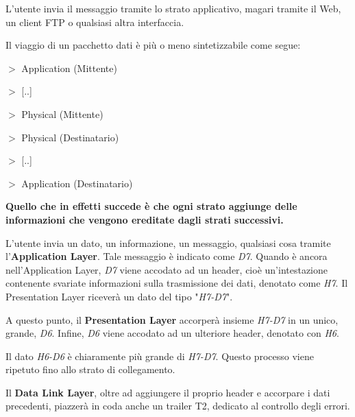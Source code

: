         L'utente invia il messaggio tramite lo strato applicativo, magari tramite il Web, un client FTP o qualsiasi altra interfaccia.
        
        \vspace{3mm}
        
        Il viaggio di un pacchetto dati è più o meno sintetizzabile come segue:
        
        \vspace{3mm}
        
        \(>\) Application (Mittente) 
        
        \(>\) [..] 
        
        \(>\) Physical (Mittente) 
        
        \(>\) Physical (Destinatario) 
        
        \(>\) [..] 
        
        \(>\) Application (Destinatario)
        
        \vspace{3mm}
        
        \textbf{Quello che in effetti succede è che ogni strato aggiunge delle informazioni che vengono ereditate dagli strati successivi.}
        
        L'utente invia un dato, un informazione, un messaggio, qualsiasi cosa tramite l'\textbf{Application Layer}. Tale messaggio è indicato come \textit{D7}. Quando è ancora nell'Application Layer, \textit{D7} viene accodato ad un header, cioè un'intestazione contenente svariate informazioni sulla trasmissione dei dati, denotato come \textit{H7}. Il Presentation Layer riceverà un dato del tipo "\textit{H7-D7}". 
        
        \vspace{3mm}
        
        A questo punto, il \textbf{Presentation Layer} accorperà insieme \textit{H7-D7} in un unico, grande, \textit{D6}. Infine, \textit{D6} viene accodato ad un ulteriore header, denotato con \textit{H6}. 
        
        \vspace{3mm}
        
        Il dato \textit{H6-D6} è chiaramente più grande di \textit{H7-D7}. Questo processo viene ripetuto fino allo strato di collegamento. 
        
        \vspace{3mm}
        
        Il \textbf{Data Link Layer}, oltre ad aggiungere il proprio header e accorpare i dati precedenti, piazzerà in coda anche un trailer T2, dedicato al controllo degli errori. 
        
